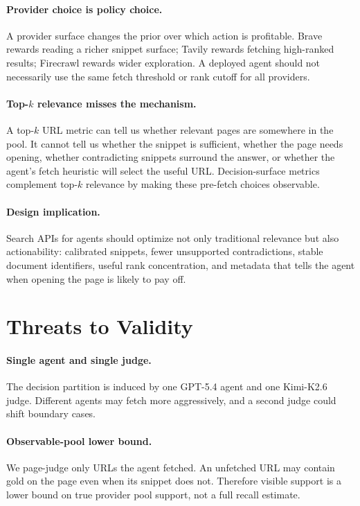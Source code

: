 \documentclass[11pt]{article}
\begin{document}
\paragraph{Provider choice is policy choice.} A provider surface changes the prior over which action is profitable. Brave rewards reading a richer snippet surface; Tavily rewards fetching high-ranked results; Firecrawl rewards wider exploration. A deployed agent should not necessarily use the same fetch threshold or rank cutoff for all providers.

\paragraph{Top-$k$ relevance misses the mechanism.} A top-$k$ URL metric can tell us whether relevant pages are somewhere in the pool. It cannot tell us whether the snippet is sufficient, whether the page needs opening, whether contradicting snippets surround the answer, or whether the agent's fetch heuristic will select the useful URL. Decision-surface metrics complement top-$k$ relevance by making these pre-fetch choices observable.

\paragraph{Design implication.} Search APIs for agents should optimize not only traditional relevance but also actionability: calibrated snippets, fewer unsupported contradictions, stable document identifiers, useful rank concentration, and metadata that tells the agent when opening the page is likely to pay off.

\section{Threats to Validity}
\label{sec:limitations}

\paragraph{Single agent and single judge.} The decision partition is induced by one GPT-5.4 agent and one Kimi-K2.6 judge. Different agents may fetch more aggressively, and a second judge could shift boundary cases.

\paragraph{Observable-pool lower bound.} We page-judge only URLs the agent fetched. An unfetched URL may contain gold on the page even when its snippet does not. Therefore visible support is a lower bound on true provider pool support, not a full recall estimate.
\end{document}
